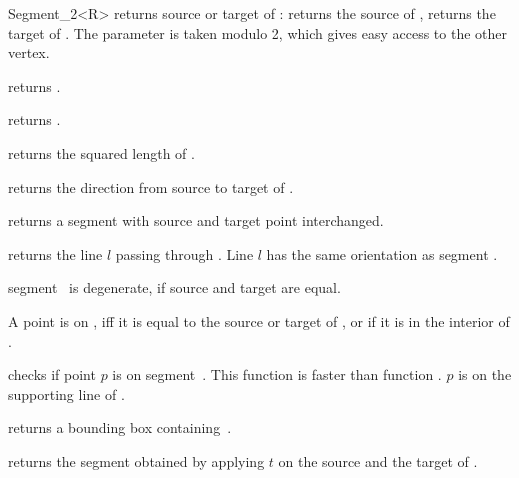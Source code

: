 \begin{ccRefClass} {Segment_2<R>}
       {returns source or target   of \ccVar:    returns
        the source of \ccVar,  returns the target of \ccVar. 
        The parameter  is taken modulo 2, which gives 
        easy access to the other vertex. }

	{returns .}

       {returns .}

       {returns the squared length of \ccVar. }

       {returns the direction from source to target of \ccVar.}


       {returns a segment with source and target point interchanged.}

       {returns the line $l$ passing through \ccVar. Line $l$  has the
        same orientation as segment \ccVar.}

\ccPredicates

       {segment \ccVar\ is degenerate, if source and target are equal.}

       {}
\ccGlue
{}
       {}

       {A point is on \ccVar, iff it is equal to the source or target 
        of \ccVar, or if it is in the interior of \ccVar.}

       {checks if point $p$ is on segment~\ccVar. This function is faster
        than function .
        \ccPrecond $p$ is on the supporting line of \ccVar.}


       {returns a bounding box containing~\ccVar.}

       {returns the segment obtained by applying $t$ on the source
        and the target of \ccVar.}

\ccSeeAlso
{}\\

\end{ccRefClass} 
